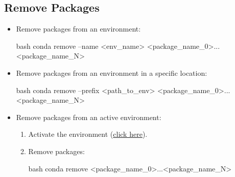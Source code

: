 
\subsection{Remove Packages}

\begin{itemize}
    \item Remove packages from an environment:
    \begin{mintedbox}{bash}
conda remove --name <env_name> <package_name_0>...<package_name_N>
    \end{mintedbox}
    \item Remove packages from an environment in a specific location:
    \begin{mintedbox}{bash}
conda remove --prefix <path_to_env> <package_name_0>...<package_name_N>
    \end{mintedbox}
    \item Remove packages from an active environment:
    \begin{enumerate}
        \item Activate the environment (\hyperref[conda:activateEnv]{click here}).
        \item Remove packages:
        \begin{mintedbox}{bash}
conda remove <package_name_0>...<package_name_N>
        \end{mintedbox}
    \end{enumerate}
\end{itemize}
